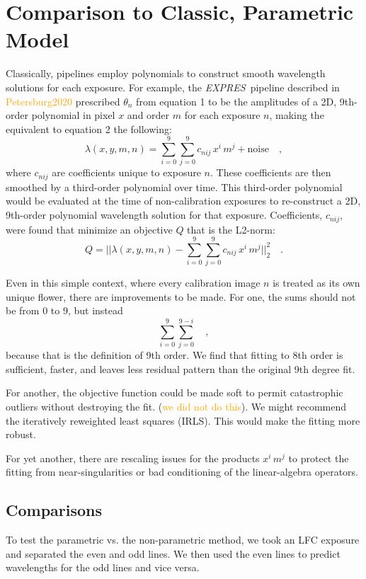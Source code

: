 \documentclass[twocolumn]{aastex63}
\newcommand{\lz}[1]{\textcolor{orange}{#1}}
\newcommand{\project}[1]{\textsl{#1}}
\newcommand{\acronym}[1]{{\small{#1}}}
\newcommand{\expres}{\project{\acronym{EXPRES}}}
\begin{document}
\section{Comparison to Classic, Parametric Model} \label{sec:comparisons}
Classically, pipelines employ polynomials to construct smooth wavelength solutions for each exposure.  For example, the \expres\ pipeline described in \lz{Petersburg2020} prescribed $\theta_{n}$ from equation 1 to be the amplitudes of a 2D, 9th-order polynomial in pixel $x$ and order $m$ for each exposure $n$, making the equivalent to equation 2 the following:
\begin{equation}
\lambda(x,y,m,n) = \sum_{i=0}^9\sum_{j=0}^9 c_{nij}\, x^i\,m^j + \mathrm{noise}
\quad ,
\end{equation}
where $c_{nij}$ are coefficients unique to exposure $n$.  These coefficients are then smoothed by a third-order polynomial over time.  This third-order polynomial would be evaluated at the time of non-calibration exposures to re-construct a 2D, 9th-order polynomial wavelength solution for that exposure.
Coefficients, $c_{nij}$, were found that minimize an objective $Q$ that is the L2-norm:
\begin{equation}
Q = ||\lambda(x,y,m,n) - \sum_{i=0}^9\sum_{j=0}^9 c_{nij}\, x^i\,m^j||_2^2
\quad .
\end{equation}

Even in this simple context, where every calibration image $n$ is treated as its own unique flower, there are improvements to be made.
For one, the sums should not be from 0 to 9, but instead
\begin{equation}
\sum_{i=0}^9\sum_{j=0}^{9-i}
\quad ,
\end{equation}
because that is the definition of 9th order.  We find that fitting to 8th order is sufficient, faster, and leaves less residual pattern than the original 9th degree fit.

For another, the objective function could be made soft to permit catastrophic outliers without destroying the fit. (\lz{we did not do this}).  We might recommend the iteratively reweighted least squares (IRLS).  This would make the fitting more robust.

For yet another, there are rescaling issues for the products $x^i\,m^j$ to protect the fitting from near-singularities or bad conditioning of the linear-algebra operators.

\subsection{Comparisons}
To test the parametric vs. the non-parametric method, we took an LFC exposure and separated the even and odd lines.  We then used the even lines to predict wavelengths for the odd lines and vice versa.
\end{document}
